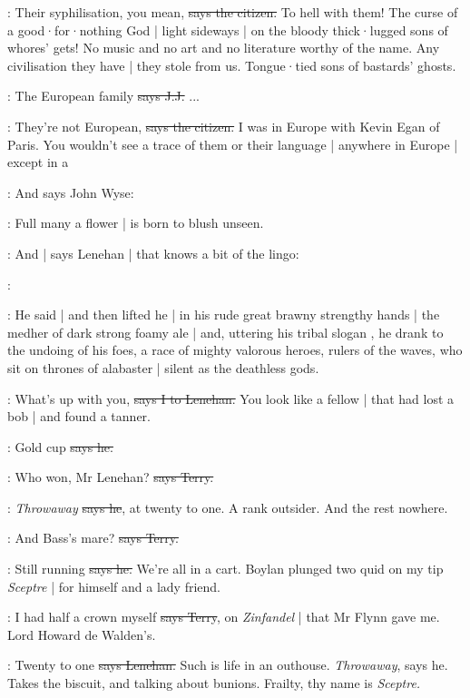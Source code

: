 \citizen:
Their syphilisation,
you mean,
\sout{says the citizen.}
To hell with them!
The curse of a good·for·nothing God |
light sideways |
on the bloody thick·lugged sons of whores' gets!
No music and no art and no literature worthy of the name.
Any civilisation they have |
they stole from us.
Tongue·tied sons of bastards' ghosts.

\jjom:
The European family
\sout{says J.J.}
...

\citizen:
They're not European,
\sout{says the citizen.}
I was in Europe with Kevin Egan of Paris.
You wouldn't see a trace of them or their language |
anywhere in Europe |
except in a 

\Nq:
And says John Wyse:

\johnwyse:
Full many a flower |
is born to blush unseen.

\Nq:
And |
says Lenehan |
that knows a bit of the lingo:

\lenehan:

:
He said |
and then lifted he
 |
in his rude great brawny strengthy hands |
the medher of dark strong foamy ale |
and,
uttering his tribal slogan ,
he drank to the undoing of his foes,
a race of mighty valorous heroes,
rulers of the waves,
who sit on thrones of alabaster |
silent as the deathless gods.

:
What's up with you,
\sout{says I to Lenehan.}
You look like a fellow |
that had lost a bob |
and found a tanner.

\lenehan:
Gold cup
\sout{says he.}

\terry:
Who won,
Mr Lenehan?
\sout{says Terry.}

\lenehan:
\emph{Throwaway}
\sout{says he},
at twenty to one.
A rank outsider.
And the rest nowhere.%

\terry:
And Bass's mare?
\sout{says Terry.}

\lenehan:
Still running
\sout{says he.}
We're all in a cart.
Boylan plunged two quid on my tip \emph{Sceptre} |
for himself and a lady friend.

\terry:
I had half a crown myself
\sout{says Terry},
on \emph{Zinfandel} |
that Mr Flynn gave me.
Lord Howard de Walden's.

\lenehan:
Twenty to one
\sout{says Lenehan.}
Such is life in an outhouse.
\emph{Throwaway},
says he.
Takes the biscuit,
and talking about bunions.
Frailty,
thy name is \emph{Sceptre.}

